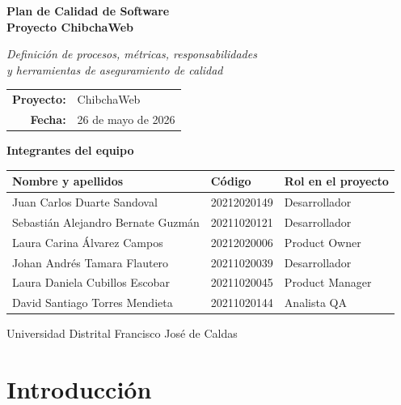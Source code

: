 \documentclass[12pt,a4paper]{article}
\begin{document}
\begin{titlepage}
\centering
\vspace*{2cm}
{\Huge\bfseries Plan de Calidad de Software\\[0.4em]
Proyecto ChibchaWeb\par}
\vspace{1.5cm}
{\Large\itshape Definición de procesos, métricas, responsabilidades\\y herramientas de aseguramiento de calidad\par}
\vspace{2cm}
{\large
\begin{tabular}{rl}
\textbf{Proyecto:}   & ChibchaWeb \\
\textbf{Fecha:}      & 26 de mayo de 2026 \\
\end{tabular}\par}
\vspace{1.5cm}

{\large\textbf{Integrantes del equipo}\par}
\vspace{0.5cm}
\begin{tabular}{lll}
\toprule
\textbf{Nombre y apellidos} & \textbf{Código} & \textbf{Rol en el proyecto} \\
\midrule
Juan Carlos Duarte Sandoval & 20212020149 & Desarrollador \\
Sebastián Alejandro Bernate Guzmán & 20211020121 & Desarrollador \\
Laura Carina Álvarez Campos & 20212020006 & Product Owner \\
Johan Andrés Tamara Flautero & 20211020039 & Desarrollador \\
Laura Daniela Cubillos Escobar & 20211020045 & Product Manager \\
David Santiago Torres Mendieta & 20211020144 & Analista QA \\
\bottomrule
\end{tabular}

\vfill
{\small Universidad Distrital Francisco José de Caldas}
\end{titlepage}

\tableofcontents
\newpage

\section{Introducción}
\end{document}
